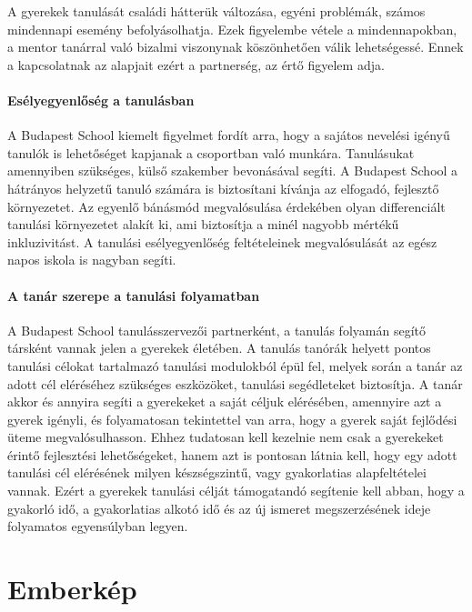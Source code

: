 A gyerekek tanulását családi hátterük változása, egyéni problémák,
számos mindennapi esemény befolyásolhatja. Ezek figyelembe vétele a
mindennapokban, a mentor tanárral való bizalmi viszonynak köszönhetően
válik lehetségessé. Ennek a kapcsolatnak az alapjait ezért a partnerség,
az értő figyelem adja.

\paragraph{Esélyegyenlőség a
      tanulásban}

A Budapest School kiemelt figyelmet fordít arra, hogy a sajátos nevelési
igényű tanulók is lehetőséget kapjanak a csoportban való munkára.
Tanulásukat amennyiben szükséges, külső szakember bevonásával segíti. A
Budapest School a hátrányos helyzetű tanuló számára is biztosítani
kívánja az elfogadó, fejlesztő környezetet. Az egyenlő bánásmód
megvalósulása érdekében olyan differenciált tanulási környezetet alakít
ki, ami biztosítja a minél nagyobb mértékű inkluzivitást. A tanulási
esélyegyenlőség feltételeinek megvalósulását az egész napos iskola is
nagyban segíti.




\paragraph{A tanár szerepe a tanulási
      folyamatban}

A Budapest School tanulásszervezői partnerként, a tanulás folyamán
segítő társként vannak jelen a gyerekek életében. A tanulás tanórák
helyett pontos tanulási célokat tartalmazó tanulási modulokból épül fel,
melyek során a tanár az adott cél eléréséhez szükséges eszközöket,
tanulási segédleteket biztosítja. A tanár akkor és annyira segíti a
gyerekeket a saját céljuk elérésében, amennyire azt a gyerek igényli, és
folyamatosan tekintettel van arra, hogy a gyerek saját fejlődési üteme
megvalósulhasson. Ehhez tudatosan kell kezelnie nem csak a gyerekeket
érintő fejlesztési lehetőségeket, hanem azt is pontosan látnia kell,
hogy egy adott tanulási cél elérésének milyen készségszintű, vagy
gyakorlatias alapfeltételei vannak. Ezért a gyerekek tanulási célját
támogatandó segítenie kell abban, hogy a gyakorló idő, a gyakorlatias
alkotó idő és az új ismeret megszerzésének ideje folyamatos egyensúlyban
legyen.

\section{Emberkép}
\label{sec:gyerekkep}

